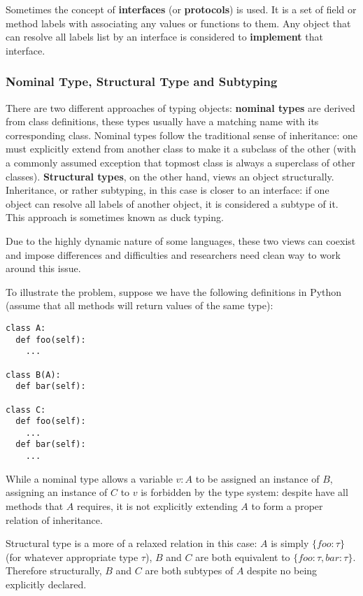 Sometimes the concept of \textbf{interfaces} (or \textbf{protocols}) is used. It is a set of
field or method labels with associating any values or functions to them.
Any object that can resolve all labels list by an interface is considered to
\textbf{implement} that interface.

\subsubsection{Nominal Type, Structural Type and Subtyping}

There are two different approaches of typing objects:
\textbf{nominal types} are derived from class definitions, these types usually have a matching name with its
corresponding class.  Nominal types follow the traditional sense of inheritance:
one must explicitly extend from another class to make it a subclass of the other
(with a commonly assumed exception that topmost class is always a superclass of other classes).
\textbf{Structural types}, on the other hand, views an object structurally.
Inheritance, or rather subtyping, in this case is closer to an interface: if one object can resolve all labels of another object, it is considered a subtype of it. This approach is sometimes known as duck typing.

Due to the highly dynamic nature of some languages, these two views can coexist and
impose differences and difficulties and researchers need clean way to work around this issue.

To illustrate the problem, suppose we have the following definitions in Python
(assume that all methods will return values of the same type):

\begin{verbatim}
class A:
  def foo(self):
    ...

class B(A):
  def bar(self):
  
class C:
  def foo(self):
    ...
  def bar(self):
    ...
\end{verbatim}

While a nominal type allows a variable $v : A$ to be assigned an instance of $B$,
assigning an instance of $C$ to $v$ is forbidden by the type system: despite
have all methods that $A$ requires, it is not explicitly extending $A$ to form a proper relation of
inheritance.

Structural type is a more of a relaxed relation in this case: $A$ is simply $\{foo: \tau \}$ (for whatever appropriate type $\tau$), $B$ and $C$ are both equivalent to $\{foo: \tau, bar: \tau\}$. Therefore structurally, $B$ and $C$ are both subtypes of $A$ despite no being explicitly declared.

